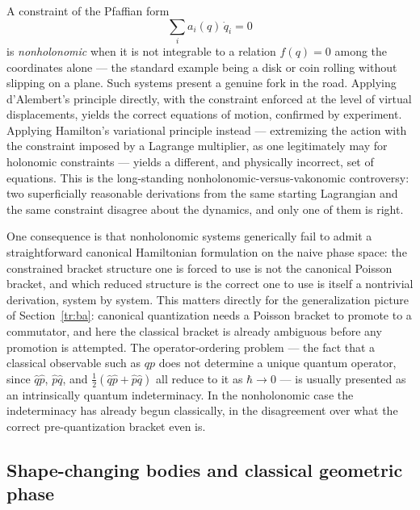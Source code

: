 A constraint of the Pfaffian form
\begin{equation}
  \sum_i a_i(q)\,\dot q_i = 0
\end{equation}
is \emph{nonholonomic} when it is not integrable to a relation $f(q)=0$ among the
coordinates alone --- the standard example being a disk or coin rolling without
slipping on a plane. Such systems present a genuine fork in the road. Applying
d'Alembert's principle directly, with the constraint enforced at the level of
virtual displacements, yields the correct equations of motion, confirmed by
experiment. Applying Hamilton's variational principle instead --- extremizing the
action with the constraint imposed by a Lagrange multiplier, as one legitimately
may for holonomic constraints --- yields a different, and physically incorrect,
set of equations. This is the long-standing nonholonomic-versus-vakonomic
controversy: two superficially reasonable derivations from the same starting
Lagrangian and the same constraint disagree about the dynamics, and only one of
them is right.

One consequence is that nonholonomic systems generically fail to admit a
straightforward canonical Hamiltonian formulation on the naive phase space:
the constrained bracket structure one is forced to use is not the canonical
Poisson bracket, and which reduced structure is the correct one to use is itself
a nontrivial derivation, system by system. This matters directly for the
generalization picture of Section~\ref{tr:ba}: canonical quantization
needs a Poisson bracket to promote to a commutator, and here the classical
bracket is already ambiguous before any promotion is attempted. The
operator-ordering problem --- the fact that a classical observable such as $qp$
does not determine a unique quantum operator, since $\hat q\hat p$, $\hat p\hat
q$, and $\tfrac12(\hat q\hat p+\hat p\hat q)$ all reduce to it as $\hbar\to0$
--- is usually presented as an intrinsically quantum indeterminacy. In the
nonholonomic case the indeterminacy has already begun classically, in the
disagreement over what the correct pre-quantization bracket even is.

\subsection{Shape-changing bodies and classical geometric phase}

